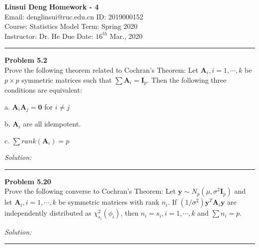 \documentclass[a4paper, 11pt]{article}
\newenvironment{problem}[2][Problem]
    { \begin{mdframed}[backgroundcolor=gray!20] \textbf{#1 #2} \\}
    {  \end{mdframed}}
\newenvironment{solution}
    {\textit{Solution:}}
    {}
\begin{document}
\noindent
\large\textbf{Linsui Deng} \hfill \textbf{Homework - 4}   \\
Email: denglinsui@ruc.edu.cn \hfill ID: 2019000152 \\
\normalsize Course: Statistics Model \hfill Term: Spring 2020\\
Instructor: Dr. He  \hfill Due Date: $16^{th}$ Mar., 2020 \\
\noindent\rule{7in}{2.8pt}

\begin{problem}{5.2}
Prove the following theorem related to Cochran’s Theorem: Let $\mathbf{A}_i, i = 1, \cdots , k$
be $p × p$ symmetric matrices such that $\sum \mathbf{A}_i = \mathbf{I}_p$. Then the following three
conditions are equivalent:

a. $\mathbf{A}_{i} \mathbf{A}_{j}=\mathbf{0}$ for $i \neq j$

b. $\mathbf{A}_{i}$ are all idempotent.

c. $\sum r a n k\left(\mathbf{A}_{i}\right)=p$
\end{problem}
\begin{solution}


\end{solution} 

\noindent\rule{7in}{2.8pt}


\begin{problem}{5.20}
	Prove the following converse to Cochran’s Theorem: Let $\mathbf{y} \sim N_{p}\left(\mu, \sigma^{2} \mathbf{I}_{p}\right)$ and
	let $\mathbf{A}_i, i = 1,\cdots, k$ be symmetric matrices with rank $n_i$. If $\left(1 / \sigma^{2}\right) \mathbf{y}^{T} \mathbf{A}_{i} \mathbf{y}$ are
	independently distributed as $\chi_{s_{i}}^{2}\left(\phi_{i}\right)$, then $n_i = s_i, i = 1, \cdots , k$ and $\sum n_i = p$.
\end{problem}
\begin{solution}
	
\end{solution} 

\noindent\rule{7in}{2.8pt}
\end{document}
